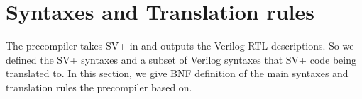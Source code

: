 \section{Syntaxes and Translation rules}
The precompiler takes SV+ in and outputs the Verilog RTL descriptions. So we defined the SV+ syntaxes and a subset of Verilog syntaxes that SV+ code being translated to. In this section, we give BNF definition of the main syntaxes and  translation rules the precompiler based on.
